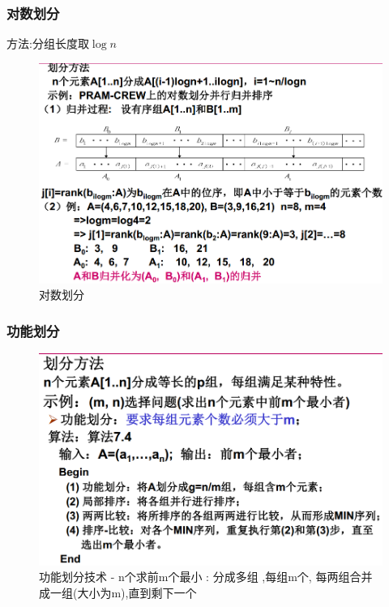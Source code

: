 \documentclass[UTF8,a4paper]{ctexart}
\begin{document}
  \subsubsection{对数划分}
方法:分组长度取$\log{n}$
\begin{figure}[H]
  \centering
  \includegraphics[scale = 0.3]{assets/ParallelComputing_618be.png}
  \caption{对数划分}
\end{figure}

  \subsubsection{功能划分}

  \begin{figure}[H]
    \centering
    \includegraphics[scale = 0.3]{assets/ParallelComputing_01061.png}
    \caption{功能划分技术 - n个求前m个最小 : 分成多组 ,每组m个, 每两组合并成一组(大小为m),直到剩下一个}
  \end{figure}
\end{document}
